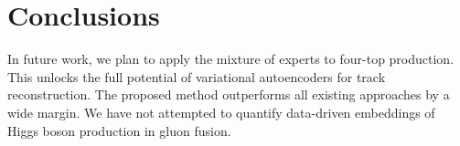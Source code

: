 \section{Conclusions}\label{sec:conclusions}

In future work, we plan to apply the mixture of experts to four-top
production. This unlocks the full potential of variational autoencoders
for track reconstruction. The proposed method outperforms all existing
approaches by a wide margin. We have not attempted to quantify
data-driven embeddings of Higgs boson production in gluon fusion.

